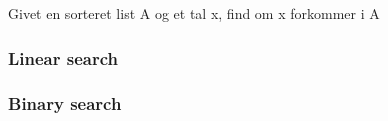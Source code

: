 Givet en sorteret list A og et tal x, find om x forkommer i A 
\subsubsection{Linear search}


\subsubsection{Binary search}

